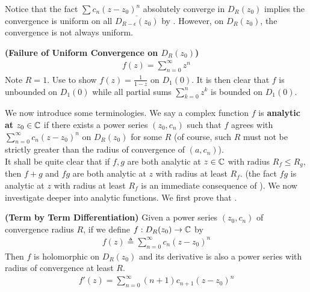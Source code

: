 \documentclass{report}
\begin{document}
\begin{mdframed}
Notice that the fact $\sum c_n(z-z_0)^n$ absolutely converge in $D_R(z_0)$ implies the convergence is uniform on all $\overline{D_{R-\epsilon }(z_0)}$ by . However, on $D_R(z_0)$, the convergence is not always uniform. 
\begin{Example}{\textbf{(Failure of Uniform Convergence on $D_R(z_0)$)}}{}
\begin{align*}
f(z)=\sum_{n=0}^\infty z^n
\end{align*}
Note $R=1$. Use  to show $f(z)=\frac{1}{1-z}$ on $D_1(0)$. It is then clear that $f$ is unbounded on  $D_1(0)$ while all partial sums $\sum_{k=0}^n z^k$ is bounded on $D_1(0)$. 
\end{Example}

We now introduce some terminologies. We say a complex function $f$ is \textbf{analytic at} $z_0\in\mathbb{C}$ if there exists a power series $(z_0,c_n)$ such that $f$ agrees with $\sum_{n=0}^\infty c_n(z-z_0)^n$ on $D_R(z_0)$ for some $R$  (of course, such $R$ must not be strictly greater than the radius of convergence of $(a,c_n)$).\\

It shall be quite clear that if $f,g$ are both analytic at  $z\in\mathbb{C}$ with radius $R_f\leq R_g$, then $f+g$ and $fg$ are both analytic at  $z$ with radius at least $R_f$. (the fact $fg$ is analytic at $z$ with radius at least $R_f$ is an immediate consequence of  ). We now investigate deeper into analytic functions. We first prove that .  
\end{mdframed}
\begin{theorem}
\label{AfaS}
\textbf{(Term by Term Differentiation)} Given a power series $(z_0,c_n)$ of convergence radius $R$, if we define $f:D_R(z_0)\rightarrow \mathbb{C}$ by
\begin{align*}
f(z)\triangleq \sum _{n=0}^{\infty}c_n(z-z_0)^n 
\end{align*}
Then $f$ is holomorphic on $D_{R}(z_0)$ and its derivative is also a power series with radius of convergence at least $R$.
 \begin{align*}
f'(z)= \sum_{n=0}^{\infty}(n+1)c_{n+1}(z-z_0)^n
\end{align*}
\end{theorem}
\end{document}
